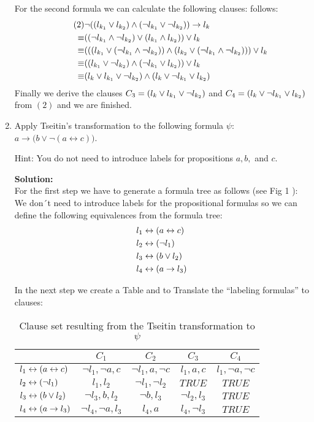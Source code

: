 \documentclass[11pt,a4paper]{uebung}
\newcommand{\solution}[1]{\par {\bf Solution:}\\#1}
\begin{document}
\begin{enumerate}
{\begin{itemize}
     For the second formula we can calculate the following clauses:
      follows:
      \begin{align*}
        \tag{2}& \neg((l_{k_1} \lor l_{k_2}) \land (\neg l_{k_1} \lor
        \neg l_{k_2})) \rightarrow l_{k}\\
        \equiv & ((\neg l_{k_1} \land \neg l_{k_2}) \lor (l_{k_1} \land
        l_{k_2}))\lor l_{k}\\
        \equiv & (((l_{k_1} \lor (\neg l_{k_1}\land\neg l_{k_2})) \land (l_{k_2}
        \lor (\neg l_{k_1}\land\neg l_{k_2})))\lor l_{k}\\
        \equiv & ((l_{k_1} \lor\neg l_{k_2}) \land (\neg l_{k_1}\lor l_{k_2})) \lor
        l_{k}\\
        \equiv & (l_{k} \lor l_{k_1} \lor\neg l_{k_2}) \land (l_{k} \lor \neg l_{k_1}\lor l_{k_2})
      \end{align*}
      Finally we derive the clauses 
      $C_{3}=(l_{k} \lor l_{k_1} \lor\neg l_{k_2})$
      and $C_{4}=(l_{k} \lor \neg l_{k_1}\lor l_{k_2})$ from $(2)$ and we are finished.
    \end{itemize} 
  }

\item Apply Tseitin's transformation to the following formula $\psi$: $a \rightarrow
  \big( b \lor \neg (a \leftrightarrow c)\big)$.

  
  Hint: You do not need to introduce labels for propositions $a,b,$ and $c$.
  \solution{
For the first step we have to generate a formula tree as follows (see Fig 1 ):
We don´t need to introduce labels for the propositional formulas so we can define the following equivalences from the formula tree:
    \begin{align*}
      l_1 &\leftrightarrow (a \leftrightarrow c)\\
      l_2 &\leftrightarrow (\neg l_{1})\\
      l_3 &\leftrightarrow (b \lor l_{2})\\
      l_4 &\leftrightarrow (a \rightarrow l_{3})\\
    \end{align*}

In the next step we create a Table and to Translate the “labeling formulas” to clauses:

    \begin{table}[ht]
      \centering
      \begin{tabular}{l|cccc}
        & $C_{1}$ & $C_{2}$ & $C_{3}$ & $C_{4}$ \\
        \hline
        $l_1 \leftrightarrow (a \leftrightarrow c)$ & $\neg l_{1},\neg a,c$ & $\neg l_{1}, a,
        \neg c$ & $l_{1}, a, c$ & $l_{1},\neg a, \neg c$\\
        $l_{2}\leftrightarrow (\neg l_{1})$& $l_{1},l_{2}$ & $\neg l_{1}, \neg
        l_{2}$ & $TRUE$ & $TRUE$\\
        $l_3 \leftrightarrow (b \lor l_{2})$ & $\neg l_{3},b,l_{2}$ & $\neg b,
        l_{3}$ & $\neg l_{2},l_{3}$ &$TRUE$\\
        $l_4 \leftrightarrow (a \rightarrow l_{3})$ & $\neg l_{4}, \neg a, l_{3}$ &
        $l_{4},a$ & $l_{4}, \neg l_{3}$&$TRUE$
      \end{tabular}
      \caption{Clause set resulting from the Tseitin transformation to $\psi$}
      \label{tab:tseitin}
    \end{table}

}
\end{enumerate}
\end{document}

